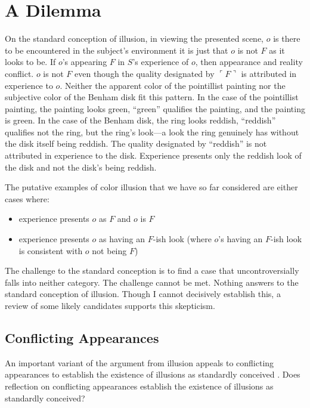 \documentclass[12pt]{article}
\begin{document}

\section{A Dilemma}\label{sec:a_dilemma} %

On the standard conception of illusion, in viewing the presented scene, \( o \) is there to be encountered in the subject's environment it is just that \( o \) is not \( F \) as it looks to be. If \( o \)'s appearing \( F \) in \( S \)'s experience of \( o \), then appearance and reality conflict. \( o \) is not \( F \) even though the quality designated by \( \ulcorner F \urcorner \) is attributed in experience to \( o \).  Neither the apparent color of the pointillist painting nor the subjective color of the Benham disk fit this pattern. In the case of the pointillist painting, the painting looks green, ``green'' qualifies the painting, and the painting is green. In the case of the Benham disk, the ring looks reddish, ``reddish'' qualifies not the ring, but the ring's look---a look the ring genuinely has without the disk itself being reddish. The quality designated by ``reddish'' is not attributed in experience to the disk. Experience presents only the reddish look of the disk and not the disk's being reddish.

The putative examples of color illusion that we have so far considered are either cases where:
\begin{itemize}
	\item experience presents \( o \) as \( F \) and \( o \) is \( F \)
	\item experience presents \( o \) as having an \( F \)-ish look (where \( o \)'s having an \( F \)-ish look is consistent with \( o \) not being \( F \))
\end{itemize}
The challenge to the standard conception is to find a case that uncontroversially falls into neither category. The challenge cannot be met. Nothing answers to the standard conception of illusion. Though I cannot decisively establish this, a review of some likely candidates supports this skepticism.

\subsection{Conflicting Appearances}\label{sub:conflicting_appearances} %

An important variant of the argument from illusion appeals to conflicting appearances to establish the existence of illusions as standardly conceived \citep[see, for example, the version of the argument discussed by][]{Ayer:1956la}. Does reflection on conflicting appearances establish the existence of illusions as standardly conceived?
\end{document}
